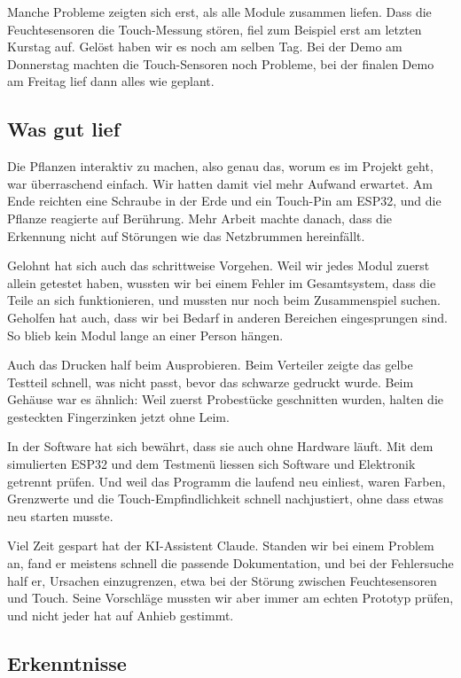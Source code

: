 \documentclass[11pt,a4paper]{article}
\begin{document}
Manche Probleme zeigten sich erst, als alle Module zusammen liefen. Dass die Feuchtesensoren die Touch-Messung stören, fiel zum Beispiel erst am letzten Kurstag auf. Gelöst haben wir es noch am selben Tag. Bei der Demo am Donnerstag machten die Touch-Sensoren noch Probleme, bei der finalen Demo am Freitag lief dann alles wie geplant.

\subsection{Was gut lief}

Die Pflanzen interaktiv zu machen, also genau das, worum es im Projekt geht, war überraschend einfach. Wir hatten damit viel mehr Aufwand erwartet. Am Ende reichten eine Schraube in der Erde und ein Touch-Pin am ESP32, und die Pflanze reagierte auf Berührung. Mehr Arbeit machte danach, dass die Erkennung nicht auf Störungen wie das Netzbrummen hereinfällt.

Gelohnt hat sich auch das schrittweise Vorgehen. Weil wir jedes Modul zuerst allein getestet haben, wussten wir bei einem Fehler im Gesamtsystem, dass die Teile an sich funktionieren, und mussten nur noch beim Zusammenspiel suchen. Geholfen hat auch, dass wir bei Bedarf in anderen Bereichen eingesprungen sind. So blieb kein Modul lange an einer Person hängen.

Auch das Drucken half beim Ausprobieren. Beim Verteiler zeigte das gelbe Testteil schnell, was nicht passt, bevor das schwarze gedruckt wurde. Beim Gehäuse war es ähnlich: Weil zuerst Probestücke geschnitten wurden, halten die gesteckten Fingerzinken jetzt ohne Leim.

In der Software hat sich bewährt, dass sie auch ohne Hardware läuft. Mit dem simulierten ESP32 und dem Testmenü liessen sich Software und Elektronik getrennt prüfen. Und weil das Programm die  laufend neu einliest, waren Farben, Grenzwerte und die Touch-Empfindlichkeit schnell nachjustiert, ohne dass etwas neu starten musste.

Viel Zeit gespart hat der KI-Assistent Claude. Standen wir bei einem Problem an, fand er meistens schnell die passende Dokumentation, und bei der Fehlersuche half er, Ursachen einzugrenzen, etwa bei der Störung zwischen Feuchtesensoren und Touch. Seine Vorschläge mussten wir aber immer am echten Prototyp prüfen, und nicht jeder hat auf Anhieb gestimmt.

\subsection{Erkenntnisse}
\end{document}
